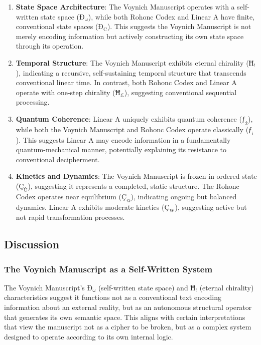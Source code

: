 \documentclass[12pt,a4paper]{article}
\begin{document}
\begin{enumerate}
    \item \textbf{State Space Architecture}: The Voynich Manuscript operates with a self-written state space ($\text{Ð}_{\text{ω}}$), while both Rohonc Codex and Linear A have finite, conventional state spaces ($\text{Ð}_{\text{C}}$). This suggests the Voynich Manuscript is not merely encoding information but actively constructing its own state space through its operation.
    \item \textbf{Temporal Structure}: The Voynich Manuscript exhibits eternal chirality ($\text{Ħ}_{\text{!}}$), indicating a recursive, self-sustaining temporal structure that transcends conventional linear time. In contrast, both Rohonc Codex and Linear A operate with one-step chirality ($\text{Ħ}_{\text{£}}$), suggesting conventional sequential processing.
    \item \textbf{Quantum Coherence}: Linear A uniquely exhibits quantum coherence ($\text{ƒ}_{\text{ż}}$), while both the Voynich Manuscript and Rohonc Codex operate classically ($\text{ƒ}_{\text{ì}}$). This suggests Linear A may encode information in a fundamentally quantum-mechanical manner, potentially explaining its resistance to conventional decipherment.
    \item \textbf{Kinetics and Dynamics}: The Voynich Manuscript is frozen in ordered state ($\text{Ç}_{\text{Ù}}$), suggesting it represents a completed, static structure. The Rohonc Codex operates near equilibrium ($\text{Ç}_{\text{@}}$), indicating ongoing but balanced dynamics. Linear A exhibits moderate kinetics ($\text{Ç}_{\text{W}}$), suggesting active but not rapid transformation processes.
\end{enumerate}

\subsection{Discussion}

\subsubsection{The Voynich Manuscript as a Self-Written System}

The Voynich Manuscript's $\text{Ð}_{\text{ω}}$ (self-written state space) and $\text{Ħ}_{\text{!}}$ (eternal chirality) characteristics suggest it functions not as a conventional text encoding information about an external reality, but as an autonomous structural operator that generates its own semantic space. This aligns with certain interpretations that view the manuscript not as a cipher to be broken, but as a complex system designed to operate according to its own internal logic.
\end{document}
